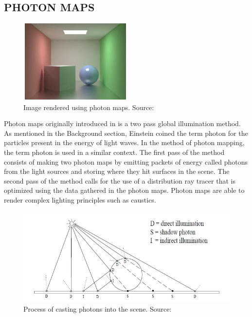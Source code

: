 \subsection{PHOTON MAPS}

\begin{figure}[h!]
  \centering
    \includegraphics[width=0.5\textwidth]{photonSample.jpg}
  \caption{Image rendered using photon maps. Source: \protect\cite{Jensen1996}}
	\label{fig:photonSample}
\end{figure}

Photon maps originally introduced in \cite{Jensen1996} is a two pass global illumination method.  As mentioned in the Background section, Einstein coined the term photon for the particles present in the energy of light waves.  In the method of photon mapping, the term photon is used in a similar context.  The first pass of the method consists of making two photon maps by emitting packets of energy called photons from the light sources and storing where they hit surfaces in the scene.  The second pass of the method calls for the use of a distribution ray tracer that is optimized using the data gathered in the photon maps.  Photon maps are able to render complex lighting principles such as caustics.

\begin{figure}[h!]
  \centering
    \includegraphics[width=1.0\textwidth]{photonCalc.jpg}
  \caption{Process of casting photons into the scene. Source: \protect\cite{Jensen1996}}
	\label{fig:photonCalc}
\end{figure}

